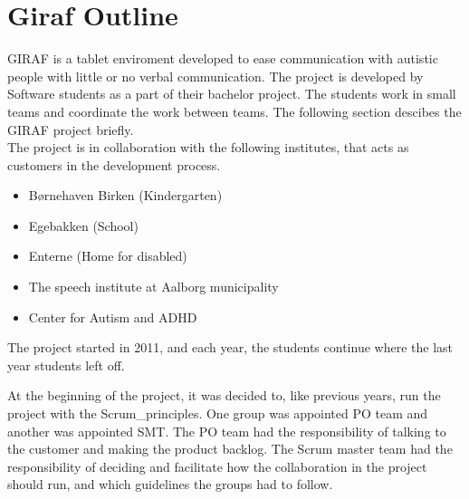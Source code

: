 \chapter{Giraf Outline}

GIRAF is a tablet enviroment developed to ease communication with autistic people with little or no verbal communication. The project is developed by Software students as a part of their bachelor project. The students work in small teams and coordinate the work between teams. The following section descibes the GIRAF project briefly. \\

The project is in collaboration with the following institutes\cite{GirafWebsite}, that acts as customers in the development process.

\begin{itemize}
    \item Børnehaven Birken (Kindergarten) \cite{bhBirken}
    \item Egebakken (School) \cite{egebakken}
    \item Enterne (Home for disabled) \cite{enterne}
    \item The speech institute at Aalborg municipality
    \item Center for Autism and ADHD \cite{center_for_autism}
\end{itemize}

The project started in 2011, and each year, the students continue where the last year students left off.

At the beginning of the project, it was decided to, like previous years, run the project with the \gls{Scrum_principles}. One group was appointed \gls{PO} team and another was appointed \gls{SMT}. The \gls{PO} team had the responsibility of talking to the customer and making the product backlog. The Scrum master team had the responsibility of deciding and facilitate how the collaboration in the project should run, and which guidelines the groups had to follow.